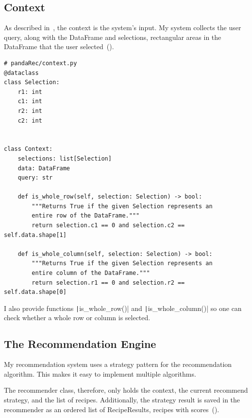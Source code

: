 \documentclass[
     12pt,                    %
     a4paper,             %
     BCOR=10mm,     %
     DIV=14,                 %
     listof=totoc,                    %
     bibliography=totoc,       %
     index=totoc,              %
     twoside,
     headsepline
     ]{scrreprt}
\begin{document}
\subsection{Context}

As described in~, the context is the system's input. My system collects the user query, along with the DataFrame and selections, rectangular areas in the DataFrame that the user selected~().

\begin{listing}[htb]
	\begin{verbatim}
# pandaRec/context.py
@dataclass
class Selection:
	r1: int
	c1: int
	r2: int
	c2: int


class Context:
	selections: list[Selection]
	data: DataFrame
	query: str
	
	def is_whole_row(self, selection: Selection) -> bool:
		"""Returns True if the given Selection represents an
		entire row of the DataFrame."""
		return selection.c1 == 0 and selection.c2 == self.data.shape[1]
	
	def is_whole_column(self, selection: Selection) -> bool:
		"""Returns True if the given Selection represents an
		entire column of the DataFrame."""
		return selection.r1 == 0 and selection.r2 == self.data.shape[0]
	\end{verbatim}
	\caption[Context Class]{Context Class.\label{list:context}}
\end{listing}

I also provide functions \texttt|is_whole_row()| and \texttt|is_whole_column()| so one can check whether a whole row or column is selected.

\subsection{The Recommendation Engine}

My recommendation system uses a strategy pattern for the recommendation algorithm. This makes it easy to implement multiple algorithms.

The recommender class, therefore, only holds the context, the current recommend strategy, and the list of recipes. Additionally, the strategy result is saved in the recommender as an ordered list of RecipeResults, recipes with scores~().
\end{document}
